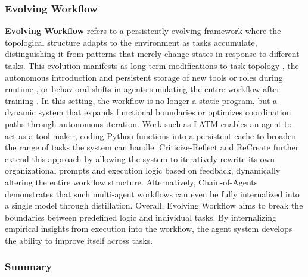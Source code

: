 \subsubsection{Evolving Workflow}
\label{sec:evolving_workflow}
\textbf{Evolving Workflow} refers to a persistently evolving framework where the topological structure adapts to the environment as tasks accumulate, distinguishing it from patterns that merely change states in response to different tasks. This evolution manifests as long-term modifications to task topology \cite{MUSE, ReCreate, Criticize_Reflect, GPTSwarm}, the autonomous introduction and persistent storage of new tools or roles during runtime \cite{Yunjue_Agent, STEVE}, or behavioral shifts in agents simulating the entire workflow after training \cite{Chain-of-Agents, ReasonRAG}. In this setting, the workflow is no longer a static program, but a dynamic system that expands functional boundaries or optimizes coordination paths through autonomous iteration. Work such as LATM \cite{LATM} enables an agent to act as a tool maker, coding Python functions into a persistent cache to broaden the range of tasks the system can handle. Criticize-Reflect \cite{Criticize_Reflect} and ReCreate \cite{ReCreate} further extend this approach by allowing the system to iteratively rewrite its own organizational prompts and execution logic based on feedback, dynamically altering the entire workflow structure. Alternatively, Chain-of-Agents \cite{Chain-of-Agents} demonstrates that such multi-agent workflows can even be fully internalized into a single model through distillation. Overall, Evolving Workflow aims to break the boundaries between predefined logic and individual tasks. By internalizing empirical insights from execution into the workflow, the agent system develops the ability to improve itself across tasks.

\subsubsection{Summary}

